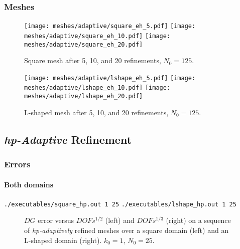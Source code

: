 \begin{frame}
    \frametitle{Meshes}

    \begin{figure}[!ht]
        \centering
        \texttt{[image: meshes/adaptive/square\_eh\_5.pdf]}
        \texttt{[image: meshes/adaptive/square\_eh\_10.pdf]}
        \texttt{[image: meshes/adaptive/square\_eh\_20.pdf]}
        \caption{Square mesh after 5, 10, and 20 refinements, $N_0 = 125$.}
    \end{figure}
    
    \begin{figure}[!ht]
        \centering
        \texttt{[image: meshes/adaptive/lshape\_eh\_5.pdf]}
        \texttt{[image: meshes/adaptive/lshape\_eh\_10.pdf]}
        \texttt{[image: meshes/adaptive/lshape\_eh\_20.pdf]}
        \caption{L-shaped mesh after 5, 10, and 20 refinements, $N_0 = 125$.}
    \end{figure}
\end{frame}

\subsection{\textit{hp-Adaptive} Refinement}

\begin{frame}[fragile]
    \frametitle{Errors}
    \framesubtitle{Both domains}

    \lstinline{./executables/square_hp.out 1 25}
    \lstinline{./executables/lshape_hp.out 1 25}

    \begin{figure}[!ht]
        
        \caption{$DG$ error versus $DOFs^{1/2}$ (left) and $DOFs^{1/3}$ (right) on a sequence of \textit{hp-adaptively} refined meshes over a square domain (left) and an L-shaped domain (right). $k_0 = 1$, $N_0 = 25$.}
    \end{figure}
\end{frame}

